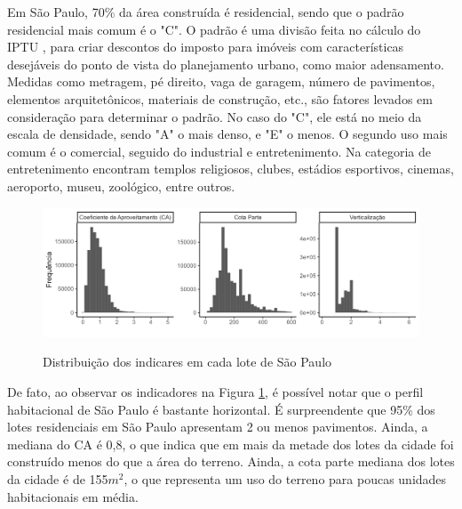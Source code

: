 Em São Paulo, 70\% da área construída é residencial, sendo que o padrão residencial mais comum é o "C". O padrão é uma divisão feita no cálculo do IPTU \cite{lei10235_1986}, para criar descontos do imposto para imóveis com características desejáveis do ponto de vista do planejamento urbano, como maior adensamento. Medidas como metragem, pé direito, vaga de garagem, número de pavimentos, elementos arquitetônicos, materiais de construção, etc., são fatores levados em consideração para determinar o padrão. No caso do "C", ele está no meio da escala de densidade, sendo "A" o mais denso, e "E" o menos. O segundo uso mais comum é o comercial, seguido do industrial e entretenimento. Na categoria de entretenimento encontram templos religiosos, clubes, estádios esportivos, cinemas, aeroporto, museu, zoológico, entre outros.

\begin{figure}[h]
    \centering
    \caption{Distribuição dos indicares em cada lote de São Paulo}
    \includegraphics[width = \linewidth]{imagens/indicadores.png}
    \label{fig:histogramas}
\end{figure}

De fato, ao observar os indicadores na Figura \ref{fig:histogramas}, é possível notar que o perfil habitacional de São Paulo é bastante horizontal. É surpreendente que 95\% dos lotes residenciais em São Paulo apresentam 2 ou menos pavimentos. Ainda, a mediana do CA é 0,8, o que indica que em mais da metade dos lotes da cidade foi construído menos do que a área do terreno. Ainda, a cota parte mediana dos lotes da cidade é de 155$m^2$, o que representa um uso do terreno para poucas unidades habitacionais em média. 

